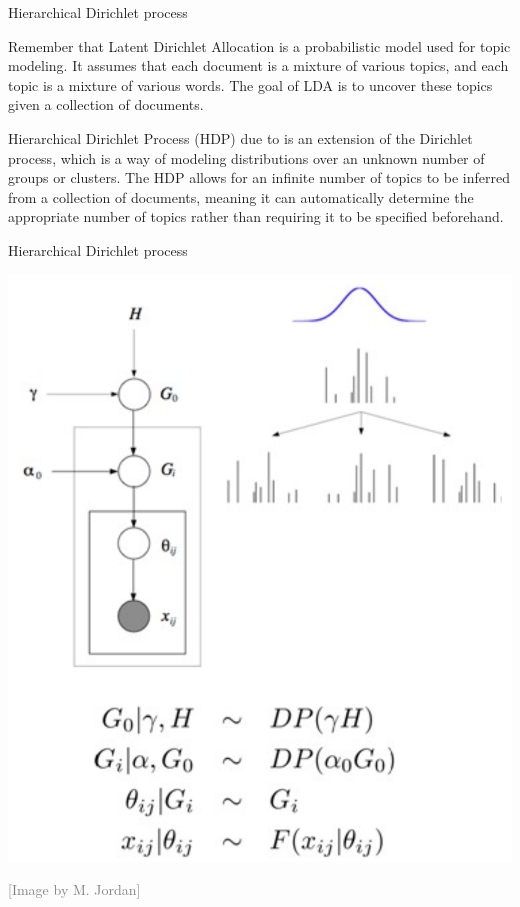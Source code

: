 \begin{frame}{Hierarchical Dirichlet process}

Remember that \alert{Latent Dirichlet Allocation} \citep[LDA,][]{blei2003latent}  is a probabilistic model used for topic modeling. It assumes that each document is a mixture of various topics, and each topic is a mixture of various words. The goal of LDA is to uncover these topics given a collection of documents.

\alert{Hierarchical Dirichlet Process} (HDP) due to  \citet{teh2006hierarchical} is an extension of the Dirichlet process, which is a way of modeling distributions over an unknown number of groups or clusters. The HDP allows for an infinite number of topics to be inferred from a collection of documents, meaning it can automatically determine the appropriate number of topics rather than requiring it to be specified beforehand.
\end{frame}

\begin{frame}{Hierarchical Dirichlet process}
\begin{center}
		\includegraphics[width=.6\textwidth]{figures_julyan/beyond_DP/HDP}
\end{center}
\hfill\textcolor{gray}{[Image by M. Jordan]}
\end{frame}

